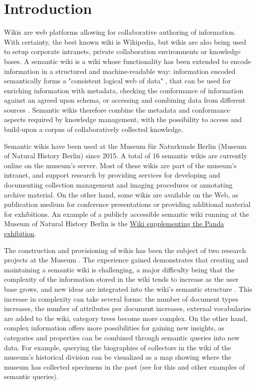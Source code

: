 \documentclass{IJCS_template}
\begin{document}
{\begin{abstract}
\end{abstract}



\section{Introduction}
Wikis are web platforms allowing for collaborative authoring of information. With certainty, the best known wiki is Wikipedia, but wikis are also being used to setup corporate intranets, private collaboration environments or knowledge bases. A semantic wiki is a wiki whose functionality has been extended to encode information in a structured and machine-readable way: information encoded semantically forms a "consistent logical web of data" \citep{berners1998semantic}, that can be used for enriching information with metadata, checking the conformance of information against an agreed upon schema, or accessing and combining data from different sources \citep{oren2006semantic}. Semantic wikis therefore combine the metadata and conformance aspects required by knowledge management, with the possibility to access and build-upon a corpus of collaboratively collected knowledge. 

Semantic wikis have been used at the Museum für Naturkunde Berlin (Museum of Natural History Berlin) since 2015. A total of 16 semantic wikis are currently online on the museum's server. Most of these wikis are part of the museum's intranet, and support research by providing services for developing and documenting collection management and imaging procedures or annotating archive material. On the other hand, some wikis are available on the Web, as publication medium for conference presentations or providing additional material for exhibitions. An example of a publicly accessible semantic wiki running at the Museum of Natural History Berlin is the \href{http://biowikifarm.net/v-mfn/panda_en/index.php}{Wiki supplementing the Panda exhibition}.

The construction and provisioning of wikis has been the subject of two research projects at the Museum \citep{patzschke2016}. The experience gained demonstrates that creating and maintaining a semantic wiki is challenging, a major difficulty being that the complexity of the information stored in the wiki tends to increase as the user base grows, and new ideas are integrated into the wiki's semantic structure \citep{kiniti2013wikis}. This increase in complexity can take several forms: the number of document types increases, the number of attributes per document increases, external vocabularies are added to the wiki, category trees become more complex. On the other hand, complex information offers more possibilities for gaining new insights, as categories and properties can be combined through semantic queries into new data. For example, querying the biographies of collectors in the wiki of the museum's historical division can be visualized as a map showing where the museum has collected specimens in the past (see \citet{ortiz2016} for this and other examples of semantic queries).

}
\end{document}
